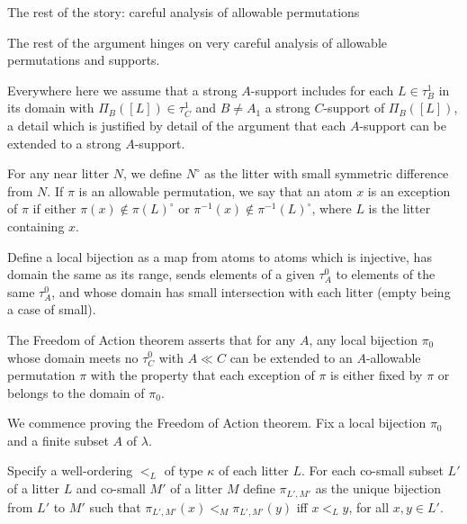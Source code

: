\documentclass{slides}
\begin{document}
\begin{slide}

{\Large The rest of the story:  careful analysis of allowable permutations}

The rest of the argument hinges on very careful analysis of allowable permutations and supports.

Everywhere here we assume that a strong $A$-support includes for each $L\in \tau^1_B$ in its domain with $\Pi_B([L]) \in \tau^1_C$ and $B \neq A_1$ a strong $C$-support of $\Pi_B([L])$, a detail which is justified by detail of the argument that each $A$-support can be extended to a strong $A$-support. 

For any near litter $N$, we define $N^\circ$ as the litter with small symmetric difference from $N$.  If $\pi$ is an allowable permutation, we say that an atom $x$ is
an exception of $\pi$ if either $\pi(x) \not\in \pi(L)^{\circ}$ or $\pi^{-1}(x) \not\in \pi^{-1}(L)^\circ$, where $L$ is the litter containing $x$.

\end{slide}

\begin{slide}

Define a local bijection as a map from atoms to atoms which is injective, has domain the same as its range,  sends elements of a given $\tau^0_A$ to elements of the same
$\tau^0_A$, and whose domain has small intersection with each litter (empty being a case of small).



The Freedom of Action theorem asserts that for any $A$, any local bijection $\pi_0$ whose domain meets no $\tau^0_C$ with $A \ll C$ can be extended to an $A$-allowable permutation $\pi$ with the property that each exception of $\pi$ is either
fixed by $\pi$ or belongs to the domain of $\pi_0$.


\end{slide}

\begin{slide}

We commence proving the Freedom of Action theorem.  Fix a local bijection $\pi_0$ and a finite subset $A$ of $\lambda$. 

Specify a well-ordering $<_L$ of type $\kappa$ of each litter $L$.  For each co-small subset $L'$ of a litter $L$ and co-small $M'$ of a litter $M$ define $\pi_{L',M'}$ as
the unique bijection from $L'$ to $M'$ such that $\pi_{L',M'}(x) <_M \pi_{L',M'}(y)$ iff $x <_L y$, for all $x,y \in L'$.  

\end{slide}
\end{document}
